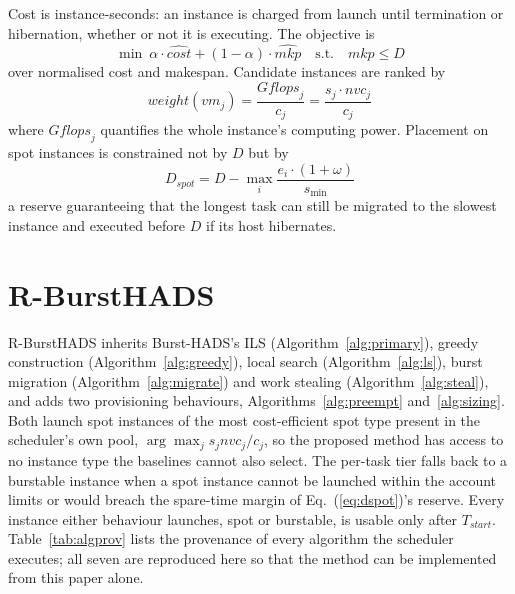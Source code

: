 \documentclass[conference]{IEEEtran}
\begin{document}
Cost is instance-seconds: an instance is charged from launch until termination
or hibernation, whether or not it is executing. The objective is
\begin{equation}
\min\ \alpha \cdot \widehat{\mathit{cost}} + (1-\alpha)\cdot \widehat{\mathit{mkp}}
\quad \text{s.t.}\quad \mathit{mkp} \leq D
\label{eq:fitness}
\end{equation}
over normalised cost and makespan. Candidate instances are ranked by
\begin{equation}
\mathit{weight}(vm_j) = \frac{\mathit{Gflops}_j}{c_j} = \frac{s_j \cdot \mathit{nvc}_j}{c_j}
\label{eq:wrr}
\end{equation}
where $\mathit{Gflops}_j$ quantifies the whole instance's computing power.
Placement on spot instances is constrained not by $D$ but by
\begin{equation}
D_{\mathit{spot}} = D - \max_i \frac{e_i \cdot (1+\omega)}{s_{\min}}
\label{eq:dspot}
\end{equation}
a reserve guaranteeing that the longest task can still be migrated to the
slowest instance and executed before $D$ if its host hibernates.

\section{R-BurstHADS}
\label{sec:design}

R-BurstHADS inherits Burst-HADS's ILS (Algorithm~\ref{alg:primary}), greedy
construction (Algorithm~\ref{alg:greedy}), local search
(Algorithm~\ref{alg:ls}), burst migration (Algorithm~\ref{alg:migrate}) and
work stealing (Algorithm~\ref{alg:steal}), and adds two provisioning
behaviours, Algorithms~\ref{alg:preempt} and~\ref{alg:sizing}. Both launch spot
instances of the most cost-efficient spot type present in the scheduler's own
pool, $\arg\max_j s_j\mathit{nvc}_j/c_j$, so the proposed method has access to
no instance type the baselines cannot also select. The per-task tier falls back
to a burstable instance when a spot instance cannot be launched within the
account limits or would breach the spare-time margin of
Eq.~(\ref{eq:dspot})'s reserve. Every instance either behaviour launches, spot
or burstable, is usable only after $T_{\mathit{start}}$. Table~\ref{tab:algprov} lists the
provenance of every algorithm the scheduler executes; all seven are reproduced
here so that the method can be implemented from this paper alone.
\end{document}
